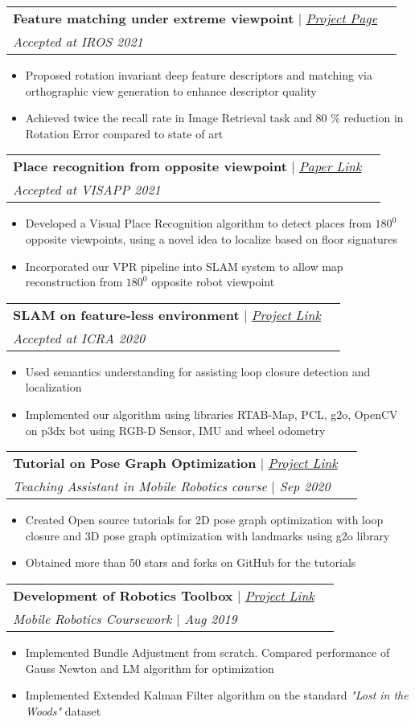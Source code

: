 \documentclass[letterpaper,11pt]{article}
\makeatletter
\newcommand{\resumeItem}[1]{
	\item\small{
		{#1 \vspace{-2pt}}
	}
}
\newcommand{\resumeProjectHeading}[2]{
		\vspace{-2pt}\item
		\begin{tabular*}{0.97\textwidth}{l@{\extracolsep{\fill}}r}
			\small#1 \\ 
			\textit{\small#2} \\
		\end{tabular*}\vspace{-7px}
}
\newcommand{\resumeItemListStart}{\begin{itemize}}
\newcommand{\resumeItemListEnd}{\end{itemize}\vspace{-5pt}}
\makeatother
\begin{document}
			\resumeProjectHeading
				{\textbf{Feature matching under extreme viewpoint} $|$ \emph{\href{https://uditsinghparihar.github.io/RoRD/}{\color{blue}Project Page}}}
				{Accepted at IROS 2021}
					\resumeItemListStart
						\resumeItem{Proposed rotation invariant deep feature descriptors and matching via orthographic view generation to enhance descriptor quality}
						\resumeItem{Achieved twice the recall rate in Image Retrieval task and 80 \% reduction in Rotation Error compared to state of art}
					\resumeItemListEnd
			
			\resumeProjectHeading
				{\textbf{Place recognition from opposite viewpoint} $|$ \emph{\href{https://arxiv.org/abs/2010.01421}{\color{blue}Paper Link}}}
				{Accepted at VISAPP 2021}
					\resumeItemListStart
						\resumeItem{Developed a Visual Place Recognition algorithm to detect places from $180^{0}$ opposite viewpoints, using a novel idea to localize based on floor signatures}
						\resumeItem{Incorporated our VPR pipeline into SLAM system to allow map reconstruction from $180^{0}$ opposite robot viewpoint}
					\resumeItemListEnd
			
			\resumeProjectHeading
				{\textbf{SLAM on feature-less environment} $|$ \emph{\href{https://github.com/Shubodh/ICRA2020}{\color{blue}Project Link}}}
				{Accepted at ICRA 2020}
					\resumeItemListStart
						\resumeItem{Used semantics understanding for assisting loop closure detection and localization}
						\resumeItem{Implemented our algorithm using libraries RTAB-Map, PCL, g2o, OpenCV on p3dx bot using RGB-D Sensor, IMU and wheel odometry}
					\resumeItemListEnd

			\resumeProjectHeading
			{\textbf{Tutorial on Pose Graph Optimization} $|$ \emph{\href{https://github.com/UditSinghParihar/g2o_tutorial}{\color{blue}Project Link}}}
			{Teaching Assistant in Mobile Robotics course $|$ Sep 2020}
				\resumeItemListStart
					\resumeItem{Created Open source tutorials for 2D pose graph optimization with loop closure and 3D pose graph optimization with landmarks using g2o library}
					\resumeItem{Obtained more than 50 stars and forks on GitHub for the tutorials}
				\resumeItemListEnd
			
			\resumeProjectHeading
				{\textbf{Development of Robotics Toolbox} $|$ \emph{\href{https://github.com/UditSinghParihar/Mobile_Robotics_Assignments}{\color{blue}Project Link}}}
				{Mobile Robotics Coursework $|$ Aug 2019}
					\resumeItemListStart
						\resumeItem{Implemented Bundle Adjustment from scratch. Compared performance of Gauss Newton and LM algorithm for optimization}
						\resumeItem{Implemented Extended Kalman Filter  algorithm on the standard \textit{"Lost in the Woods"} dataset}
					\resumeItemListEnd
			
\end{document}
